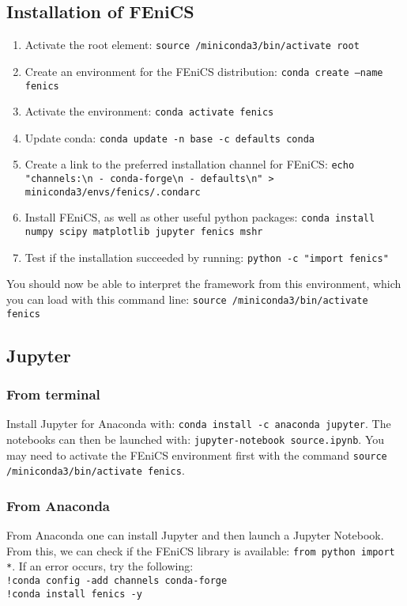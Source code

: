 \documentclass[11pt,oneside]{article}   	%
\newcommand{\fenics}{FEniCS\xspace}
\newcommand{\jupyter}{Jupyter\xspace}
\begin{document}
\subsection{Installation of FEniCS}
\begin{enumerate}
\item Activate the root element: \texttt{source /miniconda3/bin/activate root}
\item Create an environment for the \fenics distribution: \texttt{conda create --name fenics}
\item Activate the environment: \texttt{conda activate fenics}
\item Update conda: \texttt{conda update -n base -c defaults conda}
\item Create a link to the preferred installation channel for \fenics: \texttt{echo "channels:\textbackslash{}n - conda-forge\textbackslash{}n - defaults\textbackslash{}n" > miniconda3/envs/fenics/.condarc}
\item Install \fenics, as well as other useful python packages: \texttt{conda install numpy scipy matplotlib jupyter fenics mshr}
\item Test if the installation succeeded by running: \texttt{python -c "import fenics"}
\end{enumerate}
You should now be able to interpret the framework from this environment, which you can load with this command line: \texttt{source /miniconda3/bin/activate fenics}

\subsection{Jupyter}
\subsubsection{From terminal}
Install \jupyter for Anaconda with: \texttt{conda install -c anaconda jupyter}.
The notebooks can then be launched with: \texttt{jupyter-notebook source.ipynb}.
You may need to activate the \fenics environment first with the command \texttt{source /miniconda3/bin/activate fenics}.

\subsubsection{From Anaconda}
From Anaconda one can install \jupyter and then launch a \jupyter Notebook.
From this, we can check if the \fenics library is available: \texttt{from python import *}.
If an error occurs, try the following:\\
\texttt{!conda config -add channels conda-forge} \\
\texttt{!conda install fenics -y}
\end{document}
